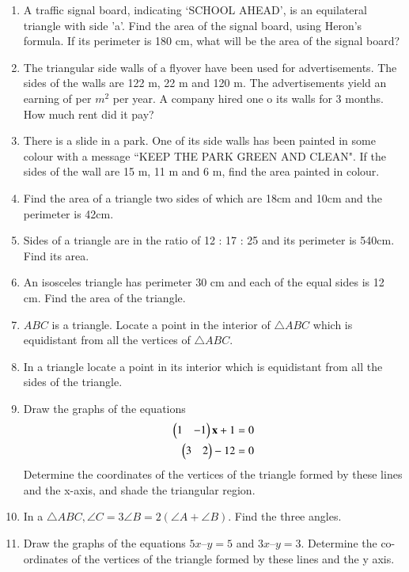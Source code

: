 \renewcommand{\theequation}{\theenumi}
\begin{enumerate}[label=\arabic*.,ref=\thesubsection.\theenumi]
%
\item A traffic signal board, indicating ‘SCHOOL AHEAD’, is an equilateral triangle with side 'a'. Find the area of the signal board, using Heron's formula. If its perimeter is 180 cm, what will be the area of the signal board?
\item The triangular side walls of a flyover have been used for advertisements. The sides of the walls are 122 m, 22 m and 120 m. The advertisements yield an earning of  per $m^2$ per year.  A company hired one o its walls for 3 months. How  much rent did it pay?
\item There is a slide in a park. One of its side walls has been painted in some colour with a message ``KEEP THE PARK GREEN AND CLEAN". If the sides of the wall are 15 m, 11 m and 6 m, find the area painted in colour.
\item Find the area of a triangle two sides of which are 18cm and 10cm and the perimeter is 42cm.
\item Sides of a triangle are in the ratio of 12 : 17 : 25 and its perimeter is 540cm. Find its area. 
\item  An isosceles triangle has perimeter 30 cm and each of the equal sides is 12 cm. Find the area of the triangle.
%
\item $ABC$ is a triangle. Locate a point in the interior of $\triangle  ABC$ which is equidistant from all the vertices of $\triangle  ABC$.
\item  In a triangle locate a point in its interior which is equidistant from all the sides of the triangle.
%
\item Draw the graphs of the equations 
\begin{align}
\begin{pmatrix}1 & -1\end{pmatrix}\mathbf{x} + 1 &= 0 
\\
\begin{pmatrix} 3 & 2\end{pmatrix} - 12 &= 0
\end{align}
%
 Determine the coordinates of the vertices of the triangle formed by these lines and the x-axis, and shade the triangular region.
%
\item In a $\triangle ABC, \angle C = 3 \angle B = 2 (\angle A + \angle B)$. Find the three angles. 
\item Draw the graphs of the equations $5x – y = 5$ and $3x – y = 3$. Determine the co-ordinates of the vertices of the triangle formed by these lines and the y axis.


\end{enumerate}
